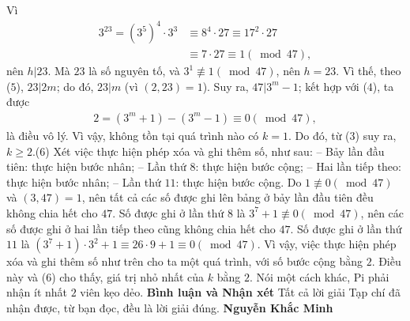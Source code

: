 \begin{multicols}{2}
	\vskip 0.05cm
	Vì
	\begin{align*}
		{3^{23}} = {\left( {{3^5}} \right)^4} \cdot {3^3} &\equiv {8^4} \cdot 27 \equiv {17^2} \cdot 27 \\
		&\equiv 7 \cdot 27 \equiv 1\left( {\bmod 47} \right),
	\end{align*}
	nên $h|23$.  Mà $23$ là số nguyên tố, và ${3^1}\not  \equiv 1\left( {\bmod 47} \right)$,  nên $h = 23$. Vì thế, theo ($5$),  $23|2m$; do đó, $23|m$  (vì $(2, 23) = 1$). Suy ra, $47|3^m-1$; kết hợp với ($4$), ta được
	\begin{align*}
		2 = \left( {{3^m} + 1} \right) - \left( {{3^m} - 1} \right) \equiv 0\left( {\bmod 47} \right),
	\end{align*}
	là điều vô lý.
	\vskip 0.05cm
	Vì vậy, không tồn tại quá trình nào có $k = 1$. Do đó, từ ($3$) suy ra, $k \ge 2$.\hfill      ($6$)
	\vskip 0.05cm
	Xét việc thực hiện phép xóa và ghi thêm số, như sau:
	\vskip 0.05cm
	-- Bảy lần đầu tiên: thực hiện bước nhân;
	\vskip 0.05cm
	-- Lần thứ $8$: thực hiện bước cộng;
	\vskip 0.05cm
	-- Hai lần tiếp theo: thực hiện bước nhân;
	\vskip 0.05cm
	-- Lần thứ $11$: thực hiện bước cộng.
	\vskip 0.05cm
	Do $1\not  \equiv 0\left( {\bmod 47} \right)$  và $(3, 47) = 1$, nên tất cả các số được ghi lên bảng ở bảy lần đầu tiên đều không chia hết cho $47$.
	\vskip 0.05cm
	Số được ghi ở lần thứ $8$ là  ${3^7} + 1\not  \equiv 0\left( {\bmod 47} \right)$, nên các số được ghi ở hai lần tiếp theo cũng không chia hết cho $47$.
	\vskip 0.05cm
	Số được ghi ở lần thứ $11$ là  $\left( {{3^7} + 1} \right) \cdot {3^2} + 1 \equiv 26 \cdot 9 + 1 \equiv 0\left( {\bmod 47} \right)$.
	\vskip 0.05cm
	Vì vậy, việc thực hiện phép xóa và ghi thêm số như trên cho ta một quá trình, với số bước cộng bằng $2$. Điều này và ($6$) cho thấy, giá trị nhỏ nhất của $k$ bằng $2$. Nói một cách khác, Pi phải nhận ít nhất $2$ viên kẹo dẻo.
	\vskip 0.05cm
	\textbf{\color{thachthuctoanhoc}Bình luận và Nhận xét}
	\vskip 0.05cm
	Tất cả lời giải Tạp chí đã nhận được, từ bạn đọc, đều là lời giải đúng.
	\vskip 0.05cm
	\hfill\textbf{\color{thachthuctoanhoc}Nguyễn Khắc Minh}
\end{multicols}
